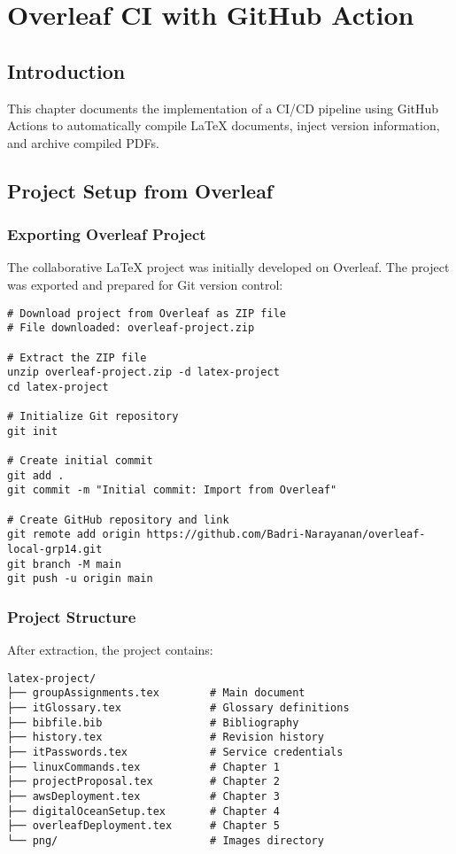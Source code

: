 \chapter{Overleaf CI with GitHub Action}
\label{chap:overleafCI}

\section{Introduction}

This chapter documents the implementation of a CI/CD pipeline using GitHub Actions to automatically compile LaTeX documents, inject version information, and archive compiled PDFs.

\section{Project Setup from Overleaf}

\subsection{Exporting Overleaf Project}

The collaborative LaTeX project was initially developed on Overleaf. The project was exported and prepared for Git version control:

\begin{verbatim}
# Download project from Overleaf as ZIP file
# File downloaded: overleaf-project.zip

# Extract the ZIP file
unzip overleaf-project.zip -d latex-project
cd latex-project

# Initialize Git repository
git init

# Create initial commit
git add .
git commit -m "Initial commit: Import from Overleaf"

# Create GitHub repository and link
git remote add origin https://github.com/Badri-Narayanan/overleaf-local-grp14.git
git branch -M main
git push -u origin main
\end{verbatim}

\subsection{Project Structure}

After extraction, the project contains:

\begin{verbatim}
latex-project/
├── groupAssignments.tex        # Main document
├── itGlossary.tex              # Glossary definitions
├── bibfile.bib                 # Bibliography
├── history.tex                 # Revision history
├── itPasswords.tex             # Service credentials
├── linuxCommands.tex           # Chapter 1
├── projectProposal.tex         # Chapter 2
├── awsDeployment.tex           # Chapter 3
├── digitalOceanSetup.tex       # Chapter 4
├── overleafDeployment.tex      # Chapter 5
└── png/                        # Images directory
\end{verbatim}

